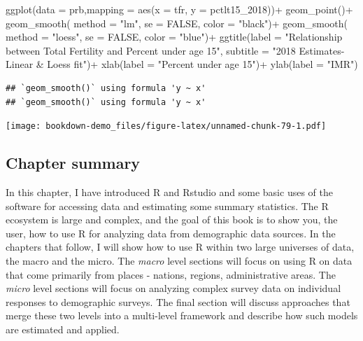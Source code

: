 \documentclass[
]{article}
\newenvironment{Shaded}{\begin{snugshade}}{\end{snugshade}}
\newcommand{\AttributeTok}[1]{\textcolor[rgb]{0.77,0.63,0.00}{#1}}
\newcommand{\ConstantTok}[1]{\textcolor[rgb]{0.00,0.00,0.00}{#1}}
\newcommand{\FunctionTok}[1]{\textcolor[rgb]{0.00,0.00,0.00}{#1}}
\newcommand{\NormalTok}[1]{#1}
\newcommand{\SpecialCharTok}[1]{\textcolor[rgb]{0.00,0.00,0.00}{#1}}
\newcommand{\StringTok}[1]{\textcolor[rgb]{0.31,0.60,0.02}{#1}}
\begin{document}
\begin{Shaded}
\begin{Highlighting}[]
\FunctionTok{ggplot}\NormalTok{(}\AttributeTok{data =}\NormalTok{ prb,}\AttributeTok{mapping =} \FunctionTok{aes}\NormalTok{(}\AttributeTok{x =}\NormalTok{ tfr, }\AttributeTok{y =}\NormalTok{ pctlt15\_2018))}\SpecialCharTok{+}
  \FunctionTok{geom\_point}\NormalTok{()}\SpecialCharTok{+}
  \FunctionTok{geom\_smooth}\NormalTok{( }\AttributeTok{method =} \StringTok{"lm"}\NormalTok{,}
               \AttributeTok{se =} \ConstantTok{FALSE}\NormalTok{,}
               \AttributeTok{color =} \StringTok{"black"}\NormalTok{)}\SpecialCharTok{+}
  \FunctionTok{geom\_smooth}\NormalTok{( }\AttributeTok{method =} \StringTok{"loess"}\NormalTok{,}
               \AttributeTok{se =} \ConstantTok{FALSE}\NormalTok{,}
               \AttributeTok{color =} \StringTok{"blue"}\NormalTok{)}\SpecialCharTok{+}
  \FunctionTok{ggtitle}\NormalTok{(}\AttributeTok{label =} \StringTok{"Relationship between Total Fertility and Percent under age 15"}\NormalTok{,}
          \AttributeTok{subtitle =} \StringTok{"2018 Estimates{-} Linear \& Loess fit"}\NormalTok{)}\SpecialCharTok{+}
  \FunctionTok{xlab}\NormalTok{(}\AttributeTok{label =} \StringTok{"Percent under age 15"}\NormalTok{)}\SpecialCharTok{+}
  \FunctionTok{ylab}\NormalTok{(}\AttributeTok{label =} \StringTok{"IMR"}\NormalTok{)}
\end{Highlighting}
\end{Shaded}

\begin{verbatim}
## `geom_smooth()` using formula 'y ~ x'
## `geom_smooth()` using formula 'y ~ x'
\end{verbatim}

\texttt{[image: bookdown-demo\_files/figure-latex/unnamed-chunk-79-1.pdf]}

\hypertarget{chapter-summary}{%
\subsection{Chapter summary}\label{chapter-summary}}

In this chapter, I have introduced R and Rstudio and some basic uses of
the software for accessing data and estimating some summary statistics.
The R ecosystem is large and complex, and the goal of this book is to
show you, the user, how to use R for analyzing data from demographic
data sources. In the chapters that follow, I will show how to use R
within two large universes of data, the macro and the micro. The \emph{macro}
level sections will focus on using R on data that come primarily from
places - nations, regions, administrative areas. The \emph{micro} level
sections will focus on analyzing complex survey data on individual
responses to demographic surveys. The final section will discuss
approaches that merge these two levels into a multi-level framework and
describe how such models are estimated and applied.
\end{document}
